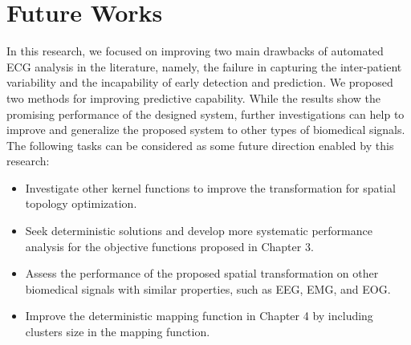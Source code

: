 \section{Future Works}
In this research, we focused on improving two main drawbacks of automated ECG analysis in the literature, namely, the failure in capturing the inter-patient variability and the incapability of early detection and prediction. We proposed two methods for improving predictive capability. While the results show the promising performance of the designed system, further investigations can help to improve and generalize the proposed system to other types of biomedical signals. The following tasks can be considered as some future direction enabled by this research:
 \begin{itemize}
\item Investigate other kernel functions to improve the transformation for spatial topology optimization.
\item Seek deterministic solutions and develop more systematic performance analysis for the objective functions proposed in Chapter 3.
\item Assess the performance of the proposed spatial transformation on other biomedical signals with similar properties, such as EEG, EMG, and EOG.
\item  Improve the deterministic mapping function in Chapter 4 by including clusters size in the mapping function.
\end{itemize}


